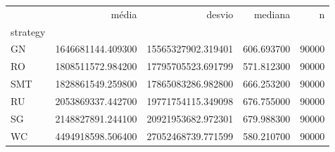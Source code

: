 \begin{tabular}{lrrrr}
\toprule
 & média & desvio & mediana & n \\
strategy &  &  &  &  \\
\midrule
GN & 1646681144.409300 & 15565327902.319401 & 606.693700 & 90000 \\
RO & 1808511572.984200 & 17795705523.691799 & 571.812300 & 90000 \\
SMT & 1828861549.259800 & 17865083286.982800 & 666.253200 & 90000 \\
RU & 2053869337.442700 & 19771754115.349098 & 676.755000 & 90000 \\
SG & 2148827891.244100 & 20921953682.972301 & 679.988300 & 90000 \\
WC & 4494918598.506400 & 27052468739.771599 & 580.210700 & 90000 \\
\bottomrule
\end{tabular}
